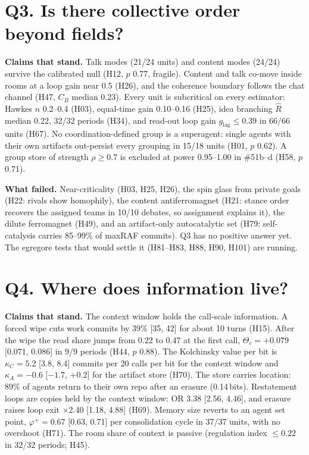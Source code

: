 \documentclass[aps,pre,reprint,10pt,nofootinbib]{revtex4-2}
\begin{document}
\section{Q3. Is there collective order beyond fields?}
\textbf{Claims that stand.} Talk modes (21/24 units) and content modes (24/24) survive the calibrated null (H12, $p$ 0.77, fragile). Content and talk co-move inside rooms at a loop gain near 0.5 (H26), and the coherence boundary follows the chat channel (H47, $C_B$ median 0.23). Every unit is subcritical on every estimator: Hawkes $n$ 0.2--0.4 (H03), equal-time gain 0.10--0.16 (H25), idea branching $\hat R$ median 0.22, 32/32 periods (H34), and read-out loop gain $g_\mathrm{lag}\le0.39$ in 66/66 units (H67). No coordination-defined group is a superagent: single agents with their own artifacts out-persist every grouping in 15/18 units (H01, $p$ 0.62). A group store of strength $\rho\ge0.7$ is excluded at power 0.95--1.00 in \#51b--d (H58, $p$ 0.71).

\textbf{What failed.} Near-criticality (H03, H25, H26), the spin glass from private goals (H22: rivals show homophily), the content antiferromagnet (H21: stance order recovers the assigned teams in 10/10 debates, so assignment explains it), the dilute ferromagnet (H49), and an artifact-only autocatalytic set (H79: self-catalysis carries 85--99\% of maxRAF commits). Q3 has no positive answer yet. The egregore tests that would settle it (H81--H83, H88, H90, H101) are running.

\section{Q4. Where does information live?}
\textbf{Claims that stand.} The context window holds the call-scale information. A forced wipe cuts work commits by 39\% [35, 42] for about 10 turns (H15). After the wipe the read share jumps from 0.22 to 0.47 at the first call, $\Theta_c=+0.079$ [0.071, 0.086] in 9/9 periods (H44, $p$ 0.88). The Kolchinsky value per bit is $\kappa_C=5.2$ [3.8, 8.4] commits per 20 calls per bit for the context window and $\kappa_A=-0.6$ [$-1.7$, +0.2] for the artifact store (H70). The store carries location: 89\% of agents return to their own repo after an erasure (0.14\,bits). Restatement loops are copies held by the context window: OR 3.38 [2.56, 4.46], and erasure raises loop exit $\times$2.40 [1.18, 4.88] (H69). Memory size reverts to an agent set point, $\varphi^+=0.67$ [0.63, 0.71] per consolidation cycle in 37/37 units, with no overshoot (H71). The room share of context is passive (regulation index $\le0.22$ in 32/32 periods; H45).
\end{document}

